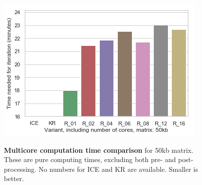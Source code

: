 \begin{figure}[!htbp]
    \begin{centering}
        {\includegraphics[scale=0.8]{figures/results/runtime_multi_50}}
        \caption[Multicore computation time comparison]
        {\textbf{Multicore computation time comparison} for 50kb matrix. These are
        pure computing times, excluding both pre- and post-processing. No numbers
        for ICE and KR are available. Smaller is better.}
        \label{fig:mrun50}
    \end{centering}
\end{figure}
